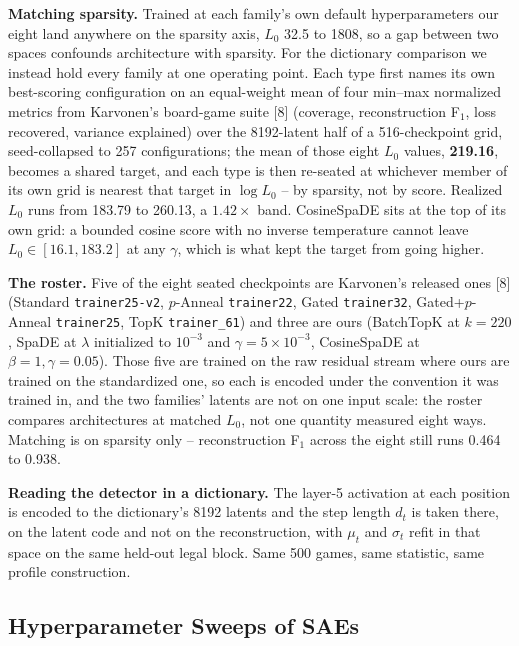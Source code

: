 \documentclass{article}
\begin{document}
\textbf{Matching sparsity.} Trained at each family's own default hyperparameters our eight land anywhere on the sparsity
axis, $L_0$ 32.5 to 1808, so a gap between two spaces confounds
architecture with sparsity. For the dictionary comparison we instead hold every family at one
operating point. Each type first names its own best-scoring configuration on an equal-weight mean
of four min--max normalized metrics from Karvonen's board-game suite [8] (coverage,
reconstruction F$_1$, loss recovered, variance explained) over the 8192-latent half of a 516-checkpoint grid, seed-collapsed to 257
configurations; the mean of those
eight $L_0$ values, \textbf{219.16}, becomes a shared target, and each type is then re-seated at
whichever member of its own grid is nearest that target in $\log L_0$ -- by sparsity, not by
score. Realized $L_0$ runs from 183.79 to 260.13, a $1.42\times$ band. CosineSpaDE sits at the top of its own grid: a bounded cosine score with no inverse
temperature cannot leave $L_0 \in [16.1, 183.2]$ at any $\gamma$, which is what kept the target
from going higher.

\textbf{The roster.} Five of the eight seated checkpoints are Karvonen's released ones [8] (Standard \texttt{trainer25-v2}, $p$-Anneal \texttt{trainer22},
Gated \texttt{trainer32}, Gated+$p$-Anneal \texttt{trainer25}, TopK \texttt{trainer\_61}) and
three are ours (BatchTopK at $k = 220$, SpaDE at $\lambda$ initialized to $10^{-3}$ and
$\gamma = 5\times10^{-3}$,
CosineSpaDE at $\beta = 1, \gamma = 0.05$). Those five are trained on the raw residual stream
where ours are trained on the standardized one, so each is encoded under the convention it was trained
in, and the two families' latents are not on one input scale: the roster compares architectures
at matched $L_0$, not one quantity measured eight ways. Matching is on sparsity only --
reconstruction F$_1$ across the eight still runs 0.464 to 0.938.

\textbf{Reading the detector in a dictionary.} The layer-5 activation at each position is encoded
to the dictionary's 8192 latents and the step length $d_t$ is taken there, on the latent
code and not on the reconstruction, with $\mu_t$ and $\sigma_t$ refit in that space on the
same held-out legal block. Same 500 games, same statistic, same profile construction.

\subsection{Hyperparameter Sweeps of SAEs}
\end{document}
